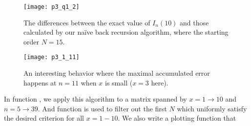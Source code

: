 \begin{figure}[H] %
    \centering
    \begin{minipage}[t]{0.45\linewidth}
        \centering
        \texttt{[image: p3\_q1\_2]}
        \caption{The differences between the exact value of $I_n(10)$ and those calculated by
            our naïve back recursion algorithm, where the starting order $N = 15$.}
        \label{fig:I_n_10}
    \end{minipage}
    \hfil
    \begin{minipage}[t]{0.45\linewidth}
        \centering
        \texttt{[image: p3\_1\_11]}
        \caption{An interesting behavior where the maximal accumulated error happens at
            $n = 11$ when $x$ is small ($x = 3$ here).}
        \label{fig:I_n_3}
    \end{minipage}
\end{figure}

In function , we apply this algorithm to a matrix spanned by
$x = 1 \to 10$ and $n = 5 \to 39$.
And function  is used to filter out the first $N$ which uniformly
satisfy the desired criterion for all $x = 1 - 10$.
We also write a plotting function that

